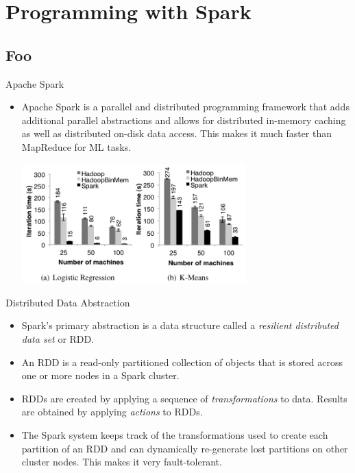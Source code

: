 \documentclass[serif,xcolor=pdftex,dvipsnames,table,hyperref={bookmarks=false,breaklinks}]{beamer}
\begin{document}
\maketitlepage

\section{Programming with Spark}
\subsection{Foo}

\begin{frame}[t]{Apache Spark}
\begin{itemize}

\item Apache Spark is a parallel and distributed programming framework that 
adds 
additional parallel abstractions and allows for distributed 
in-memory caching as well as distributed on-disk data access. This makes it 
much faster than MapReduce for ML tasks.

\pause
\center
\includegraphics[width=3.4in]{../Figures/spark_vs_hadoop.png}\\
\end{itemize}
\end{frame}

\begin{frame}[t]{Distributed Data Abstraction}
\begin{itemize}

\item Spark's primary abstraction is a data structure called a 
\textit{resilient distributed data set} or RDD.

\pause\item An RDD is a read-only partitioned collection of objects that is 
stored across one or more nodes in a Spark cluster.

\pause\item RDDs are created by applying a sequence of \textit{transformations} 
to data. Results are obtained by applying \textit{actions} to RDDs.

\pause\item The Spark system keeps track of the transformations used to create 
each partition of an RDD and can dynamically re-generate lost partitions on 
other cluster nodes. This makes it very fault-tolerant. 

\end{itemize}
\end{frame}
\end{document}
